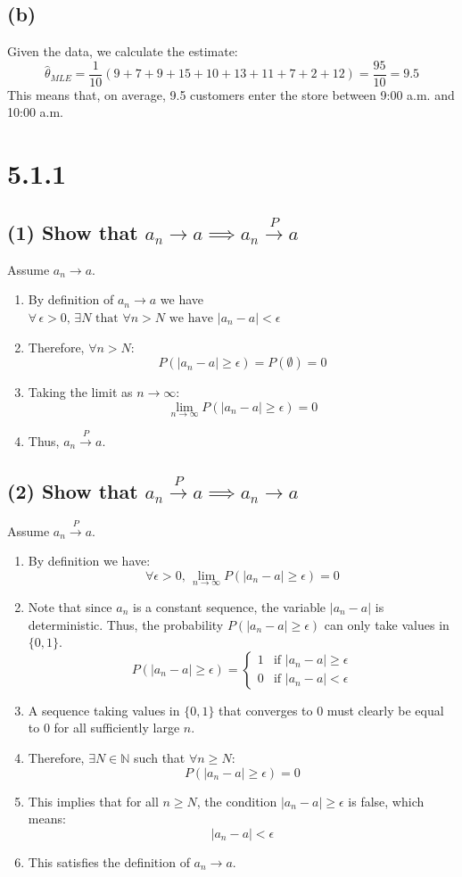 \documentclass{article}
\begin{document}
\subsection*{(b)}
Given the data, we calculate the estimate:
\[
\hat{\theta}_{MLE} = \frac{1}{10} (9+7+9+15+10+13+11+7+2+12) = \frac{95}{10} = 9.5
\]
This means that, on average, 9.5 customers enter the store between 9:00 a.m. and 10:00 a.m.
\section*{5.1.1}
\subsection*{(1) Show that $a_n \to a \implies a_n \xrightarrow{P} a$}
Assume $a_n \to a$.
\begin{enumerate}
    \item By  definition of $a_n \to a$ we have $\forall \, \epsilon > 0 , 
    \, \exists N \text{ that }\forall n > N \text{ we have }\left|a_n - a\right|<\epsilon$
    \item Therefore, $\forall n > N$:
    \[
    P\left(\left|a_n - a\right| \ge \epsilon\right) = P(\emptyset) = 0
    \]
    \item Taking the limit as $n \to \infty$:
    \[
    \lim_{n \rightarrow \infty} P\left(|a_n - a| \ge \epsilon\right) = 0
    \]
    \item Thus, $a_n \xrightarrow{P} a$.
\end{enumerate}
\subsection*{(2) Show that $a_n \xrightarrow{P} a \implies a_n \to a$}
Assume $a_n \xrightarrow{P} a$.
\begin{enumerate}
    \item By definition we have:
    \[
    \forall \epsilon > 0 , \, 
    \lim_{n \rightarrow \infty} P\left(\left|a_n - a\right| \ge \epsilon\right) = 0
    \]
    \item Note that since $a_n$ is a constant sequence, the variable $|a_n - a|$ is deterministic. Thus, the probability $P(|a_n - a| \ge \epsilon)$ can only take values in $\{0, 1\}$.
    \[
    P(|a_n - a| \ge \epsilon) = \begin{cases} 
    1 & \text{if } |a_n - a| \ge \epsilon \\
    0 & \text{if } |a_n - a| < \epsilon 
    \end{cases}
    \]
    \item A sequence taking values in $\{0, 1\}$ that converges to 0 must clearly be equal to 0 for all sufficiently large $n$.
    \item Therefore, $\exists N \in \mathbb{N}$ such that $\forall n \ge N$:
    \[
    P\left(|a_n - a| \ge \epsilon\right) = 0
    \]
    \item This implies that for all $n \ge N$, the condition $|a_n - a| \ge \epsilon$ is false, which means:
    \[
    |a_n - a| < \epsilon
    \]
    \item This satisfies the definition of $a_n \to a$.
\end{enumerate}
\end{document}
